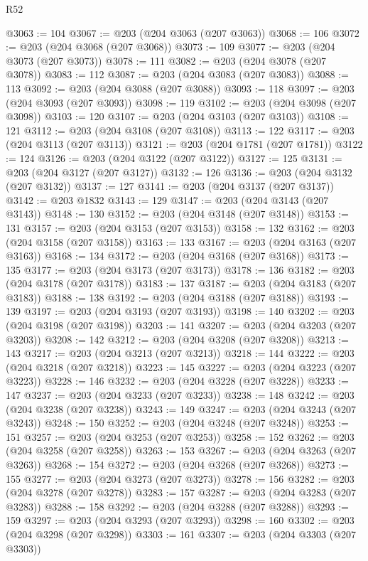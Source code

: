 \begin{lexlean}{R52}
\begin{coremodule}
@3063 := 104
@3067 := @203 (@204 @3063 (@207 @3063))
@3068 := 106
@3072 := @203 (@204 @3068 (@207 @3068))
@3073 := 109
@3077 := @203 (@204 @3073 (@207 @3073))
@3078 := 111
@3082 := @203 (@204 @3078 (@207 @3078))
@3083 := 112
@3087 := @203 (@204 @3083 (@207 @3083))
@3088 := 113
@3092 := @203 (@204 @3088 (@207 @3088))
@3093 := 118
@3097 := @203 (@204 @3093 (@207 @3093))
@3098 := 119
@3102 := @203 (@204 @3098 (@207 @3098))
@3103 := 120
@3107 := @203 (@204 @3103 (@207 @3103))
@3108 := 121
@3112 := @203 (@204 @3108 (@207 @3108))
@3113 := 122
@3117 := @203 (@204 @3113 (@207 @3113))
@3121 := @203 (@204 @1781 (@207 @1781))
@3122 := 124
@3126 := @203 (@204 @3122 (@207 @3122))
@3127 := 125
@3131 := @203 (@204 @3127 (@207 @3127))
@3132 := 126
@3136 := @203 (@204 @3132 (@207 @3132))
@3137 := 127
@3141 := @203 (@204 @3137 (@207 @3137))
@3142 := @203 @1832
@3143 := 129
@3147 := @203 (@204 @3143 (@207 @3143))
@3148 := 130
@3152 := @203 (@204 @3148 (@207 @3148))
@3153 := 131
@3157 := @203 (@204 @3153 (@207 @3153))
@3158 := 132
@3162 := @203 (@204 @3158 (@207 @3158))
@3163 := 133
@3167 := @203 (@204 @3163 (@207 @3163))
@3168 := 134
@3172 := @203 (@204 @3168 (@207 @3168))
@3173 := 135
@3177 := @203 (@204 @3173 (@207 @3173))
@3178 := 136
@3182 := @203 (@204 @3178 (@207 @3178))
@3183 := 137
@3187 := @203 (@204 @3183 (@207 @3183))
@3188 := 138
@3192 := @203 (@204 @3188 (@207 @3188))
@3193 := 139
@3197 := @203 (@204 @3193 (@207 @3193))
@3198 := 140
@3202 := @203 (@204 @3198 (@207 @3198))
@3203 := 141
@3207 := @203 (@204 @3203 (@207 @3203))
@3208 := 142
@3212 := @203 (@204 @3208 (@207 @3208))
@3213 := 143
@3217 := @203 (@204 @3213 (@207 @3213))
@3218 := 144
@3222 := @203 (@204 @3218 (@207 @3218))
@3223 := 145
@3227 := @203 (@204 @3223 (@207 @3223))
@3228 := 146
@3232 := @203 (@204 @3228 (@207 @3228))
@3233 := 147
@3237 := @203 (@204 @3233 (@207 @3233))
@3238 := 148
@3242 := @203 (@204 @3238 (@207 @3238))
@3243 := 149
@3247 := @203 (@204 @3243 (@207 @3243))
@3248 := 150
@3252 := @203 (@204 @3248 (@207 @3248))
@3253 := 151
@3257 := @203 (@204 @3253 (@207 @3253))
@3258 := 152
@3262 := @203 (@204 @3258 (@207 @3258))
@3263 := 153
@3267 := @203 (@204 @3263 (@207 @3263))
@3268 := 154
@3272 := @203 (@204 @3268 (@207 @3268))
@3273 := 155
@3277 := @203 (@204 @3273 (@207 @3273))
@3278 := 156
@3282 := @203 (@204 @3278 (@207 @3278))
@3283 := 157
@3287 := @203 (@204 @3283 (@207 @3283))
@3288 := 158
@3292 := @203 (@204 @3288 (@207 @3288))
@3293 := 159
@3297 := @203 (@204 @3293 (@207 @3293))
@3298 := 160
@3302 := @203 (@204 @3298 (@207 @3298))
@3303 := 161
@3307 := @203 (@204 @3303 (@207 @3303))

\end{coremodule}
\end{lexlean}

